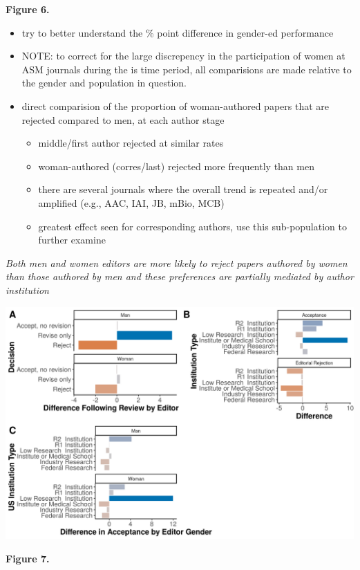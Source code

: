 \documentclass[11pt,]{article}
\providecommand{\tightlist}{%
  \setlength{\itemsep}{0pt}\setlength{\parskip}{0pt}}
\begin{document}
\textbf{Figure 6.}

\begin{itemize}
\tightlist
\item
  try to better understand the \% point difference in gender-ed
  performance
\item
  NOTE: to correct for the large discrepency in the participation of
  women at ASM journals during the is time period, all comparisions are
  made relative to the gender and population in question.
\item
  direct comparision of the proportion of woman-authored papers that are
  rejected compared to men, at each author stage

  \begin{itemize}
  \tightlist
  \item
    middle/first author rejected at similar rates
  \item
    woman-authored (corres/last) rejected more frequently than men
  \item
    there are several journals where the overall trend is repeated
    and/or amplified (e.g., AAC, IAI, JB, mBio, MCB)
  \item
    greatest effect seen for corresponding authors, use this
    sub-population to further examine
  \end{itemize}
\end{itemize}

\emph{Both men and women editors are more likely to reject papers
authored by women than those authored by men and these preferences are
partially mediated by author institution}

\includegraphics{Figure_7.png}

\textbf{Figure 7.}
\end{document}
